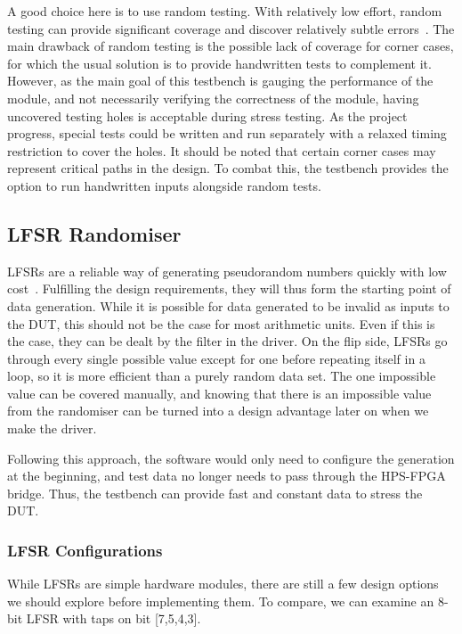 A good choice here is to use random testing.
With relatively low effort, random testing can provide significant coverage and discover relatively subtle errors~\cite{Duran1}.
The main drawback of random testing is the possible lack of coverage for corner cases, for which the usual solution is to provide handwritten tests to complement it.
However, as the main goal of this testbench is gauging the performance of the module, and not necessarily verifying the correctness of the module, having uncovered testing holes is acceptable during stress testing.
As the project progress, special tests could be written and run separately with a relaxed timing restriction to cover the holes.
It should be noted that certain corner cases may represent critical paths in the design.
To combat this, the testbench provides the option to run handwritten inputs alongside random tests.

\subsection{LFSR Randomiser}

LFSRs are a reliable way of generating pseudorandom numbers quickly with low cost~\cite{Hazwani1}.
Fulfilling the design requirements, they will thus form the starting point of data generation.
While it is possible for data generated to be invalid as inputs to the DUT, this should not be the case for most arithmetic units.
Even if this is the case, they can be dealt by the filter in the driver.
On the flip side, LFSRs go through every single possible value except for one before repeating itself in a loop, so it is more efficient than a purely random data set.
The one impossible value can be covered manually, and knowing that there is an impossible value from the randomiser can be turned into a design advantage later on when we make the driver.

Following this approach, the software would only need to configure the generation at the beginning, and test data no longer needs to pass through the HPS-FPGA bridge.
Thus, the testbench can provide fast and constant data to stress the DUT.

\subsubsection{LFSR Configurations}

While LFSRs are simple hardware modules, there are still a few design options we should explore before implementing them.
To compare, we can examine an 8-bit LFSR with taps on bit [7,5,4,3].

